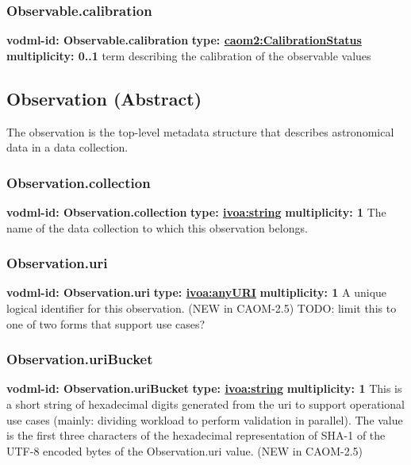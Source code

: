     \subsubsection{Observable.calibration}
      \textbf{vodml-id: Observable.calibration} \newline
      \textbf{type: \hyperref[sect:CalibrationStatus]{caom2:CalibrationStatus}} \newline
      \textbf{multiplicity: 0..1} \newline
      term describing the calibration of the observable values

  \subsection{Observation (Abstract)}
  \label{sect:Observation}
    The observation is the top-level metadata structure that describes astronomical data in a data collection.

    \subsubsection{Observation.collection}
      \textbf{vodml-id: Observation.collection} \newline
      \textbf{type: \hyperref[sect:ivoa]{ivoa:string}} \newline
      \textbf{multiplicity: 1} \newline
      The name of the data collection to which this observation belongs.

    \subsubsection{Observation.uri}
      \textbf{vodml-id: Observation.uri} \newline
      \textbf{type: \hyperref[sect:ivoa]{ivoa:anyURI}} \newline
      \textbf{multiplicity: 1} \newline
      A unique logical identifier for this observation. (NEW in CAOM-2.5) TODO: limit this to one of two forms that support use cases?

    \subsubsection{Observation.uriBucket}
      \textbf{vodml-id: Observation.uriBucket} \newline
      \textbf{type: \hyperref[sect:ivoa]{ivoa:string}} \newline
      \textbf{multiplicity: 1} \newline
      This is a short string of hexadecimal digits generated from the uri to support operational use cases (mainly: dividing workload to perform validation in parallel). The value is the first three characters of the hexadecimal representation of SHA-1 of the UTF-8 encoded bytes of the Observation.uri value. (NEW in CAOM-2.5)

